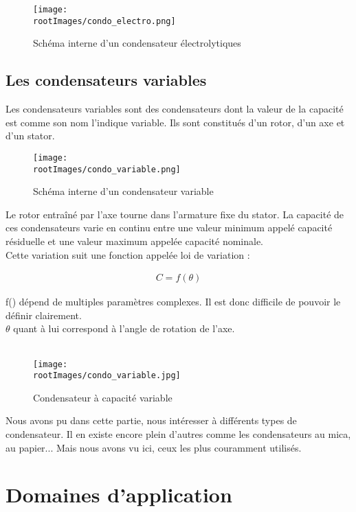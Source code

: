 \documentclass[12pt]{report}
\begin{document}
\begin{figure}[!h]
    \centering
    \texttt{[image: \\rootImages/condo\_electro.png]}
    \caption{Schéma interne d'un condensateur électrolytiques}
\end{figure}


\section{Les condensateurs variables}

Les condensateurs variables sont des condensateurs dont la valeur de la capacité est comme son nom l’indique variable. Ils sont constitués d’un rotor, d’un axe et d’un stator. 

\begin{figure}[!h]
    \centering
    \texttt{[image: \\rootImages/condo\_variable.png]}
    \caption{Schéma interne d'un condensateur variable}
\end{figure}

Le rotor entraîné par l’axe tourne dans l’armature fixe du stator. La capacité de ces condensateurs varie en continu entre une valeur minimum appelé capacité résiduelle et une valeur maximum appelée capacité nominale. \\

Cette variation suit une fonction appelée loi de variation : 

\begin{align}
    C=f(\theta)
\end{align}

f() dépend de multiples paramètres complexes. Il est donc difficile de pouvoir le définir clairement.\\
$\theta$ quant à lui correspond à l'angle de rotation de l'axe. \\ \\

\begin{figure}[!h]
    \centering
    \texttt{[image: \\rootImages/condo\_variable.jpg]}
    \caption{Condensateur à capacité variable}
\end{figure}


Nous avons pu dans cette partie, nous intéresser à différents types de condensateur. Il en existe encore plein d'autres comme les condensateurs au mica, au papier... Mais nous avons vu ici, ceux les plus couramment utilisés.
\chapter{Domaines d'application}
\end{document}
